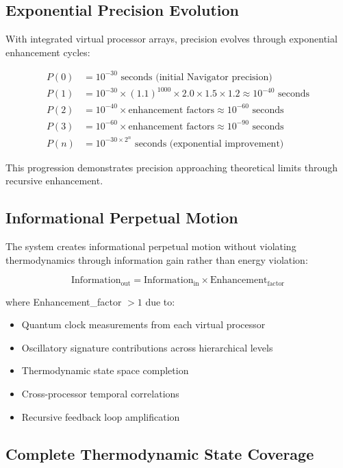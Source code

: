 \documentclass[11pt]{article}
\theoremstyle{remark}
\begin{document}
\subsection{Exponential Precision Evolution}

With integrated virtual processor arrays, precision evolves through exponential enhancement cycles:

\begin{align}
P(0) &= 10^{-30} \text{ seconds (initial Navigator precision)} \\
P(1) &= 10^{-30} \times (1.1)^{1000} \times 2.0 \times 1.5 \times 1.2 \approx 10^{-40} \text{ seconds} \\
P(2) &= 10^{-40} \times \text{enhancement factors} \approx 10^{-60} \text{ seconds} \\
P(3) &= 10^{-60} \times \text{enhancement factors} \approx 10^{-90} \text{ seconds} \\
P(n) &= 10^{-30 \times 2^n} \text{ seconds (exponential improvement)}
\end{align}

This progression demonstrates precision approaching theoretical limits through recursive enhancement.

\subsection{Informational Perpetual Motion}

The system creates informational perpetual motion without violating thermodynamics through information gain rather than energy violation:

\begin{equation}
\text{Information}_{\text{out}} = \text{Information}_{\text{in}} \times \text{Enhancement}_{\text{factor}}
\end{equation}

where Enhancement\_factor $> 1$ due to:
\begin{itemize}
\item Quantum clock measurements from each virtual processor
\item Oscillatory signature contributions across hierarchical levels
\item Thermodynamic state space completion
\item Cross-processor temporal correlations
\item Recursive feedback loop amplification
\end{itemize}

\subsection{Complete Thermodynamic State Coverage}
\end{document}
